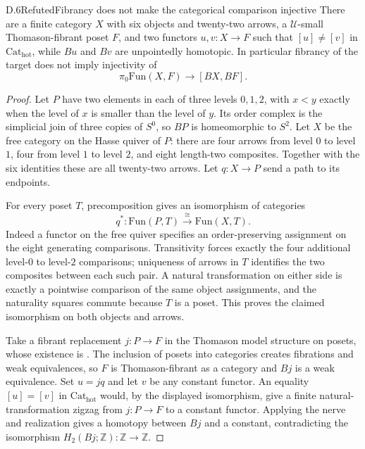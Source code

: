 \begin{claim}{D.6}{Refuted}{Fibrancy does not make the categorical comparison injective}
There are a finite category $X$ with six objects and twenty-two arrows, a $\mathcal U$-small Thomason-fibrant poset $F$, and two functors $u,v:X\to F$ such that $[u]\ne[v]$ in $\mathrm{Cat}_{\mathrm{hot}}$, while $Bu$ and $Bv$ are unpointedly homotopic. In particular fibrancy of the target does not imply injectivity of
\[
 \pi_0\mathrm{Fun}(X,F)\longrightarrow[BX,BF].
\]
\end{claim}
\begin{proof}
Let $P$ have two elements in each of three levels $0,1,2$, with $x<y$ exactly when the level of $x$ is smaller than the level of $y$. Its order complex is the simplicial join of three copies of $S^0$, so $BP$ is homeomorphic to $S^2$. Let $X$ be the free category on the Hasse quiver of $P$: there are four arrows from level $0$ to level $1$, four from level $1$ to level $2$, and eight length-two composites. Together with the six identities these are all twenty-two arrows. Let $q:X\to P$ send a path to its endpoints.

For every poset $T$, precomposition gives an isomorphism of categories
\[
 q^*:\mathrm{Fun}(P,T)\xrightarrow{\cong}\mathrm{Fun}(X,T).
\]
Indeed a functor on the free quiver specifies an order-preserving assignment on the eight generating comparisons. Transitivity forces exactly the four additional level-$0$ to level-$2$ comparisons; uniqueness of arrows in $T$ identifies the two composites between each such pair. A natural transformation on either side is exactly a pointwise comparison of the same object assignments, and the naturality squares commute because $T$ is a poset. This proves the claimed isomorphism on both objects and arrows.

Take a fibrant replacement $j:P\to F$ in the Thomason model structure on posets, whose existence is \citet[Theorem~2.6]{D_Raptis2010}. The inclusion of posets into categories creates fibrations and weak equivalences, so $F$ is Thomason-fibrant as a category and $Bj$ is a weak equivalence. Set $u=jq$ and let $v$ be any constant functor. An equality $[u]=[v]$ in $\mathrm{Cat}_{\mathrm{hot}}$ would, by the displayed isomorphism, give a finite natural-transformation zigzag from $j:P\to F$ to a constant functor. Applying the nerve and realization gives a homotopy between $Bj$ and a constant, contradicting the isomorphism $H_2(Bj;\mathbb Z):\mathbb Z\to\mathbb Z$.


\end{proof}
